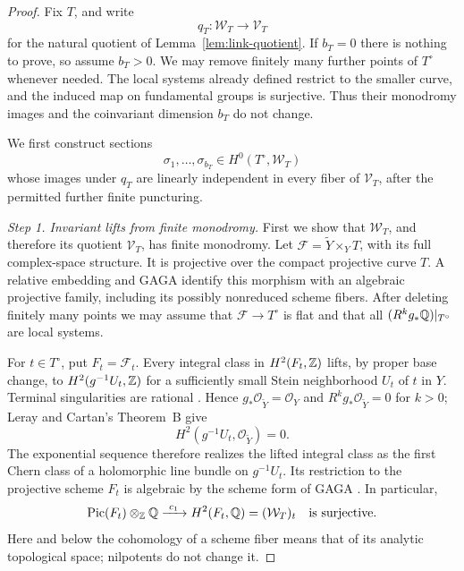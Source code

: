 \begin{proof}
Fix \(T\), and write
\[
 q_T:\mathcal W_T\longrightarrow\mathcal V_T
\]
for the natural quotient of Lemma~\ref{lem:link-quotient}.  If \(b_T=0\)
there is nothing to prove, so assume \(b_T>0\).  We may remove finitely
many further points of \(T^\circ\) whenever needed.  The local systems
already defined restrict to the smaller curve, and the induced map on
fundamental groups is surjective.  Thus their monodromy images and the
coinvariant dimension \(b_T\) do not change.

We first construct sections
\[
 \sigma_1,\ldots,\sigma_{b_T}\in H^0(T^\circ,\mathcal W_T)
\]
whose images under \(q_T\) are linearly independent in every fiber of
\(\mathcal V_T\), after the permitted further finite puncturing.

\emph{Step 1. Invariant lifts from finite monodromy.}
First we show that \(\mathcal W_T\), and therefore its quotient
\(\mathcal V_T\), has finite monodromy.  Let
\(\mathcal F=\widetilde Y\times_Y T\), with its full complex-space
structure.  It is projective over the compact projective curve \(T\).
A relative embedding and GAGA identify this morphism with an algebraic
projective family, including its possibly nonreduced scheme fibers.
After deleting finitely many points we may assume that
\(\mathcal F\to T^\circ\) is flat and that all
\((R^kg_*\mathbb{Q})|_{T^\circ}\) are local systems.

For \(t\in T^\circ\), put \(F_t=\mathcal F_t\).  Every integral class in
\(H^2(F_t,\mathbb{Z})\) lifts, by proper base change, to
\(H^2(g^{-1}U_t,\mathbb{Z})\) for a sufficiently small Stein neighborhood
\(U_t\) of \(t\) in \(Y\).  Terminal singularities are rational
\cite[Remark~3.8 and Theorem~3.12]{FujinoAnalyticMMP}.  Hence
\(g_*\mathcal O_{\widetilde Y}=\mathcal O_Y\) and
\(R^kg_*\mathcal O_{\widetilde Y}=0\) for \(k>0\); Leray and Cartan's
Theorem~B give
\[
 H^2(g^{-1}U_t,\mathcal O_{\widetilde Y})=0.
\]
The exponential sequence therefore realizes the lifted integral class
as the first Chern class of a holomorphic line bundle on \(g^{-1}U_t\).
Its restriction to the projective scheme \(F_t\) is algebraic by the
scheme form of GAGA
\cite[Corollary~4.3 and Theorem~4.4]{RaynaudSGA1XII}.  In particular,
\begin{equation}\label{eq:curve-fiber-chern}
 \operatorname{Pic}(F_t)\otimes_{\mathbb{Z}}\mathbb{Q}
 \xrightarrow{\ c_1\ } H^2(F_t,\mathbb{Q})=(\mathcal W_T)_t
 \quad\text{is surjective}.
\end{equation}
Here and below the cohomology of a scheme fiber means that of its
analytic topological space; nilpotents do not change it.


\end{proof}
